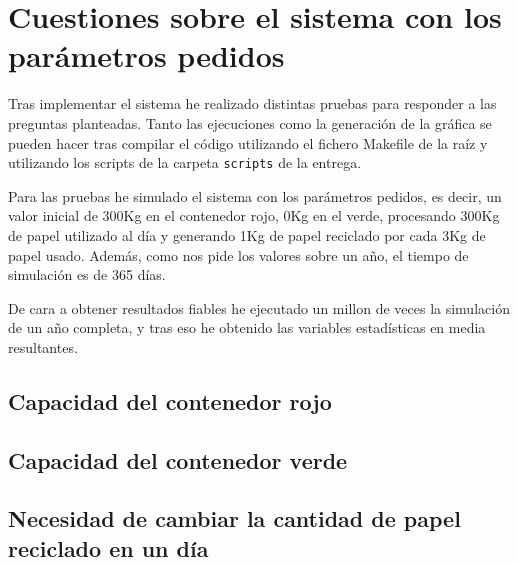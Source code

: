 \documentclass[12pt, spanish]{article}
\begin{document}
\section{Cuestiones sobre el sistema con los parámetros pedidos}

Tras implementar el sistema he realizado distintas pruebas para responder a las preguntas planteadas. Tanto las ejecuciones como la generación de la gráfica se pueden hacer tras compilar el código utilizando el fichero Makefile de la raíz y utilizando los scripts de la carpeta \texttt{scripts} de la entrega.

Para las pruebas he simulado el sistema con los parámetros pedidos, es decir, un valor inicial de 300Kg en el contenedor rojo, 0Kg en el verde, procesando 300Kg de papel utilizado al día y generando 1Kg de papel reciclado por cada 3Kg de papel usado. Además, como nos pide los valores sobre un año, el tiempo de simulación es de 365 días.

De cara a obtener resultados fiables he ejecutado un millon de veces la simulación de un año completa, y tras eso he obtenido las variables estadísticas en media resultantes.

\subsection{Capacidad del contenedor rojo}


\subsection{Capacidad del contenedor verde}

\subsection{Necesidad de cambiar la cantidad de papel reciclado en un día}



%
%
\end{document}
